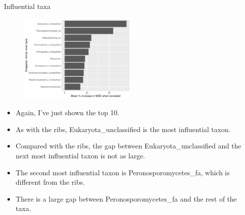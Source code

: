 \documentclass{beamer}
\begin{document}
\begin{frame}{Influential taxa}

  \begin{center}
    \begin{figure}
      \includegraphics[width=2.25in]{w_scapulae/families_scapula_PercIncMSE_barchart}
    \end{figure}
  \end{center}

  \vspace{0.05in}
  
  {\scriptsize
  \begin{itemize}
    \item Again, I've just shown the top 10.
    \item As with the ribs, Eukaryota\_unclassified is the most influential taxon.
    \item Compared with the ribs, the gap between Eukaryota\_unclassified and the
    next most influential taxon is not as large.
    \item The second most influential taxon is Peronosporomycetes\_fa, which is
    different from the ribs. 
    \item There is a large gap between Peronosporomycetes\_fa and the rest of the
    taxa.
  \end{itemize}
  }

\end{frame}
\end{document}
